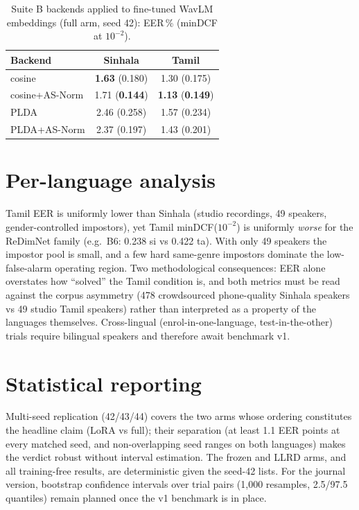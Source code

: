 \begin{table}[t]
\centering
\caption{Suite B backends applied to fine-tuned WavLM embeddings
(full arm, seed 42): EER\,\% (minDCF at $10^{-2}$).}
\label{tab:composition}
\begin{tabular}{lcc}
\toprule
\textbf{Backend} & \textbf{Sinhala} & \textbf{Tamil} \\
\midrule
cosine          & \textbf{1.63} (0.180) & 1.30 (0.175) \\
cosine+AS-Norm  & 1.71 (\textbf{0.144}) & \textbf{1.13} (\textbf{0.149}) \\
PLDA            & 2.46 (0.258) & 1.57 (0.234) \\
PLDA+AS-Norm    & 2.37 (0.197) & 1.43 (0.201) \\
\bottomrule
\end{tabular}
\end{table}

\section{Per-language analysis}
\label{sec:per-lang}

Tamil EER is uniformly lower than Sinhala (studio recordings, 49
speakers, gender-controlled impostors), yet Tamil
minDCF($10^{-2}$) is uniformly \emph{worse} for the ReDimNet family
(e.g.\ B6: 0.238 si vs 0.422 ta). With only 49 speakers the impostor
pool is small, and a few hard same-genre impostors dominate the
low-false-alarm operating region. Two methodological consequences:
EER alone overstates how ``solved'' the Tamil condition is, and both
metrics must be read against the corpus asymmetry (478 crowdsourced
phone-quality Sinhala speakers vs 49 studio Tamil speakers) rather
than interpreted as a property of the languages themselves.
Cross-lingual (enrol-in-one-language, test-in-the-other) trials
require bilingual speakers and therefore await benchmark v1.

\section{Statistical reporting}
\label{sec:significance}

Multi-seed replication (42/43/44) covers the two arms whose ordering
constitutes the headline claim (LoRA vs full); their separation
(at least 1.1 EER points at every matched seed, and non-overlapping
seed ranges on both languages) makes the verdict robust without
interval estimation. The frozen and LLRD
arms, and all training-free results, are deterministic given the
seed-42 lists. For the journal version, bootstrap confidence
intervals over trial pairs (1{,}000 resamples, 2.5/97.5 quantiles)
remain planned once the v1 benchmark is in place.
